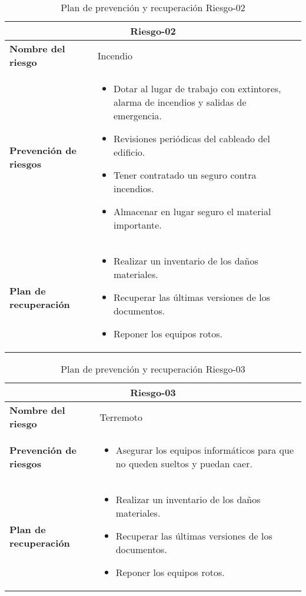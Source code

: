 \begin{table}[H]
\begin{center}
\begin{tabular}{p{} p{10cm}}
\multicolumn{2}{c}{\textbf{Riesgo-02} } \\
\hline \hline
\textbf{Nombre del riesgo} & Incendio \\
\hline
\textbf{Prevención de riesgos} & \begin{itemize}[-]
  \item Dotar al lugar de trabajo con extintores, alarma de incendios y salidas de emergencia.
  \item Revisiones periódicas del cableado del edificio.
  \item Tener contratado un seguro contra incendios.
  \item Almacenar en lugar seguro el material importante.
  \end{itemize} \\
\hline
\textbf{Plan de recuperación} &   \begin{itemize}[-]
  \item Realizar un inventario de los daños materiales.
  \item Recuperar las últimas versiones de los documentos.
  \item Reponer los equipos rotos.
  \end{itemize}\\
\hline
\end{tabular}
\caption{Plan de prevención y recuperación Riesgo-02}
\label{tab:Riesgo-02-Prev_Recup}
\end{center}
\end{table}

\begin{table}[H]
\begin{center}
\begin{tabular}{p{} p{10cm}}
\multicolumn{2}{c}{\textbf{Riesgo-03} } \\
\hline \hline
\textbf{Nombre del riesgo} & Terremoto \\
\hline
\textbf{Prevención de riesgos} & \begin{itemize}[-]
  \item Asegurar los equipos informáticos para que no queden sueltos y puedan caer.
  \end{itemize} \\
\hline
\textbf{Plan de recuperación} &   \begin{itemize}[-]
  \item Realizar un inventario de los daños materiales.
  \item Recuperar las últimas versiones de los documentos.
  \item Reponer los equipos rotos.
  \end{itemize}\\
\hline
\end{tabular}
\caption{Plan de prevención y recuperación Riesgo-03}
\label{tab:Riesgo-03-Prev_Recup}
\end{center}
\end{table}

